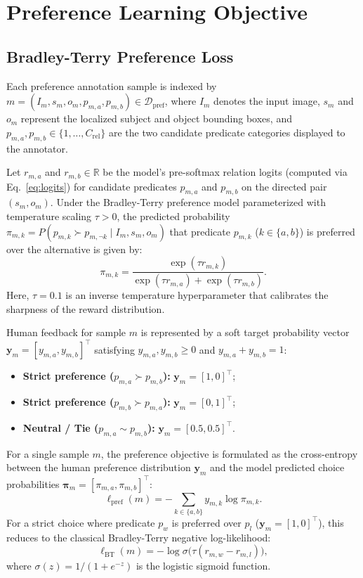 \documentclass[10pt,twocolumn,letterpaper]{article}
\begin{document}
\section{Preference Learning Objective}
\label{sec:rlhp}

\subsection{Bradley-Terry Preference Loss}

Each preference annotation sample is indexed by $m = (I_m, s_m, o_m, p_{m,a}, p_{m,b}) \in \mathcal{D}_{\mathrm{pref}}$, where $I_m$ denotes the input image, $s_m$ and $o_m$ represent the localized subject and object bounding boxes, and $p_{m,a}, p_{m,b} \in \{1, \dots, C_{\mathrm{rel}}\}$ are the two candidate predicate categories displayed to the annotator.

Let $r_{m,a}$ and $r_{m,b} \in \mathbb{R}$ be the model's pre-softmax relation logits (computed via Eq.~\eqref{eq:logits}) for candidate predicates $p_{m,a}$ and $p_{m,b}$ on the directed pair $(s_m, o_m)$. Under the Bradley-Terry preference model parameterized with temperature scaling $\tau > 0$, the predicted probability $\pi_{m,k} = P(p_{m,k} \succ p_{m,\neg k} \mid I_m, s_m, o_m)$ that predicate $p_{m,k}$ ($k \in \{a, b\}$) is preferred over the alternative is given by:
\begin{equation}
    \pi_{m,k} = \frac{\exp(\tau r_{m,k})}{\exp(\tau r_{m,a}) + \exp(\tau r_{m,b})}.
    \label{eq:bt_prob}
\end{equation}
Here, $\tau = 0.1$ is an inverse temperature hyperparameter that calibrates the sharpness of the reward distribution.

Human feedback for sample $m$ is represented by a soft target probability vector $\mathbf{y}_m = [y_{m,a}, y_{m,b}]^\top$ satisfying $y_{m,a}, y_{m,b} \ge 0$ and $y_{m,a} + y_{m,b} = 1$:
\begin{itemize}
    \item \textbf{Strict preference ($p_{m,a} \succ p_{m,b}$):} $\mathbf{y}_m = [1, 0]^\top$;
    \item \textbf{Strict preference ($p_{m,b} \succ p_{m,a}$):} $\mathbf{y}_m = [0, 1]^\top$;
    \item \textbf{Neutral / Tie ($p_{m,a} \sim p_{m,b}$):} $\mathbf{y}_m = [0.5, 0.5]^\top$.
\end{itemize}

For a single sample $m$, the preference objective is formulated as the cross-entropy between the human preference distribution $\mathbf{y}_m$ and the model predicted choice probabilities $\boldsymbol{\pi}_m = [\pi_{m,a}, \pi_{m,b}]^\top$:
\begin{equation}
    \ell_{\mathrm{pref}}(m) = -\sum_{k\in\{a,b\}} y_{m,k} \log \pi_{m,k}.
\end{equation}
For a strict choice where predicate $p_w$ is preferred over $p_l$ ($\mathbf{y}_m=[1,0]^\top$), this reduces to the classical Bradley-Terry negative log-likelihood:
\begin{equation}
    \ell_{\mathrm{BT}}(m) = -\log \sigma\big(\tau(r_{m,w} - r_{m,l})\big),
\end{equation}
where $\sigma(z) = 1/(1+e^{-z})$ is the logistic sigmoid function.
\end{document}
